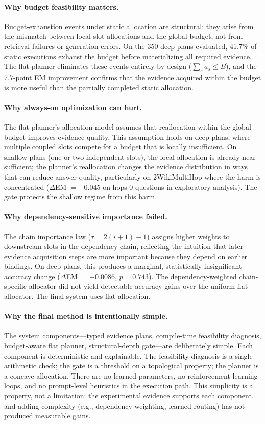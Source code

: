 \paragraph{Why budget feasibility matters.}
Budget-exhaustion events under static allocation are structural: they arise from the mismatch between local slot allocations and the global budget, not from retrieval failures or generation errors. On the 350 deep plans evaluated, 41.7\% of static executions exhaust the budget before materializing all required evidence. The flat planner eliminates these events entirely by design ($\sum_s a_s \leq B$), and the 7.7-point EM improvement confirms that the evidence acquired within the budget is more useful than the partially completed static allocation.

\paragraph{Why always-on optimization can hurt.}
The flat planner's allocation model assumes that reallocation within the global budget improves evidence quality. This assumption holds on deep plans, where multiple coupled slots compete for a budget that is locally insufficient. On shallow plans (one or two independent slots), the local allocation is already near sufficient; the planner's reallocation changes the evidence distribution in ways that can reduce answer quality, particularly on 2WikiMultiHop where the harm is concentrated ($\Delta$EM $= -0.045$ on hops-0 questions in exploratory analysis). The gate protects the shallow regime from this harm.

\paragraph{Why dependency-sensitive importance failed.}
The chain importance law ($\tau = 2(i+1) - 1$) assigns higher weights to downstream slots in the dependency chain, reflecting the intuition that later evidence acquisition steps are more important because they depend on earlier bindings. On deep plans, this produces a marginal, statistically insignificant accuracy change ($\Delta$EM $= +0.0086$, $p = 0.743$). The dependency-weighted chain-specific allocator did not yield detectable accuracy gains over the uniform flat allocator. The final system uses flat allocation.

\paragraph{Why the final method is intentionally simple.}
The system components---typed evidence plans, compile-time feasibility diagnosis, budget-aware flat planner, structural-depth gate---are deliberately simple. Each component is deterministic and explainable. The feasibility diagnosis is a single arithmetic check; the gate is a threshold on a topological property; the planner is a concave allocation. There are no learned parameters, no reinforcement-learning loops, and no prompt-level heuristics in the execution path. This simplicity is a property, not a limitation: the experimental evidence supports each component, and adding complexity (e.g., dependency weighting, learned routing) has not produced measurable gains.

